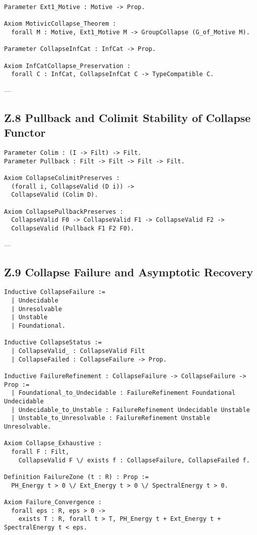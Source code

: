 \documentclass[11pt]{article}
\begin{document}
\begin{lstlisting}[language=Coq]
Parameter Ext1_Motive : Motive -> Prop.

Axiom MotivicCollapse_Theorem :
  forall M : Motive, Ext1_Motive M -> GroupCollapse (G_of_Motive M).

Parameter CollapseInfCat : InfCat -> Prop.

Axiom InfCatCollapse_Preservation :
  forall C : InfCat, CollapseInfCat C -> TypeCompatible C.
\end{lstlisting}

---

\subsection*{Z.8 Pullback and Colimit Stability of Collapse Functor}

\begin{lstlisting}[language=Coq]
Parameter Colim : (I -> Filt) -> Filt.
Parameter Pullback : Filt -> Filt -> Filt -> Filt.

Axiom CollapseColimitPreserves :
  (forall i, CollapseValid (D i)) ->
  CollapseValid (Colim D).

Axiom CollapsePullbackPreserves :
  CollapseValid F0 -> CollapseValid F1 -> CollapseValid F2 ->
  CollapseValid (Pullback F1 F2 F0).
\end{lstlisting}

---

\subsection*{Z.9 Collapse Failure and Asymptotic Recovery}

\begin{lstlisting}[language=Coq]
Inductive CollapseFailure :=
  | Undecidable
  | Unresolvable
  | Unstable
  | Foundational.

Inductive CollapseStatus :=
  | CollapseValid_ : CollapseValid Filt
  | CollapseFailed : CollapseFailure -> Prop.

Inductive FailureRefinement : CollapseFailure -> CollapseFailure -> Prop :=
  | Foundational_to_Undecidable : FailureRefinement Foundational Undecidable
  | Undecidable_to_Unstable : FailureRefinement Undecidable Unstable
  | Unstable_to_Unresolvable : FailureRefinement Unstable Unresolvable.

Axiom Collapse_Exhaustive :
  forall F : Filt,
    CollapseValid F \/ exists f : CollapseFailure, CollapseFailed f.

Definition FailureZone (t : R) : Prop :=
  PH_Energy t > 0 \/ Ext_Energy t > 0 \/ SpectralEnergy t > 0.

Axiom Failure_Convergence :
  forall eps : R, eps > 0 ->
    exists T : R, forall t > T, PH_Energy t + Ext_Energy t + SpectralEnergy t < eps.
\end{lstlisting}
\end{document}
